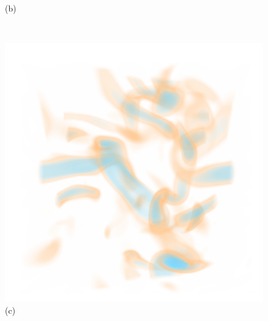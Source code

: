 \documentclass[twoside,twocolumn,10pt]{article}
\begin{document}
\begin{figure}
\begin{minipage}{.16\textwidth}
		(b)
	\end{minipage}~
	\begin{minipage}{.16\textwidth}
		\centering
		\includegraphics[width=1\linewidth]{crop/vortex_merged_segment_green_red}
		(c)
	\end{minipage}
	\begin{minipage}{.16\textwidth}
		\centering

\end{minipage}
\end{figure}
\end{document}

